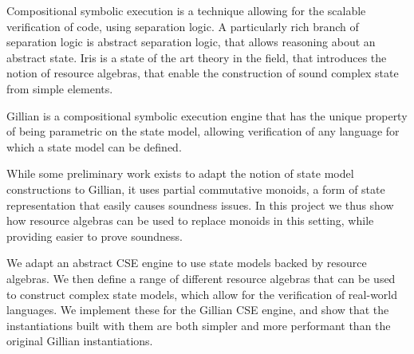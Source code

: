 Compositional symbolic execution is a technique allowing for the scalable verification of code, using separation logic. A particularly rich branch of separation logic is abstract separation logic, that allows reasoning about an abstract state. Iris is a state of the art theory in the field, that introduces the notion of resource algebras, that enable the construction of sound complex state from simple elements.

Gillian is a compositional symbolic execution engine that has the unique property of being parametric on the state model, allowing verification of any language for which a state model can be defined.

While some preliminary work exists to adapt the notion of state model constructions to Gillian, it uses partial commutative monoids, a form of state representation that easily causes soundness issues. In this project we thus show how resource algebras can be used to replace monoids in this setting, while providing easier to prove soundness.

We adapt an abstract CSE engine to use state models backed by resource algebras. We then define a range of different resource algebras that can be used to construct complex state models, which allow for the verification of real-world languages. We implement these for the Gillian CSE engine, and show that the instantiations built with them are both simpler and more performant than the original Gillian instantiations.
